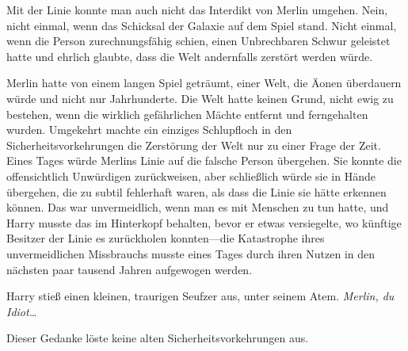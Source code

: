 Mit der Linie konnte man auch nicht das Interdikt von Merlin umgehen. Nein, nicht einmal, wenn das Schicksal der Galaxie auf dem Spiel stand. Nicht einmal, wenn die Person zurechnungsfähig schien, einen Unbrechbaren Schwur geleistet hatte und ehrlich glaubte, dass die Welt andernfalls zerstört werden würde.

Merlin hatte von einem langen Spiel geträumt, einer Welt, die Äonen überdauern würde und nicht nur Jahrhunderte. Die Welt hatte keinen Grund, nicht ewig zu bestehen, wenn die wirklich gefährlichen Mächte entfernt und ferngehalten wurden. Umgekehrt machte ein einziges Schlupfloch in den Sicherheitsvorkehrungen die Zerstörung der Welt nur zu einer Frage der Zeit.
Eines Tages würde Merlins Linie auf die falsche Person übergehen. Sie konnte die offensichtlich Unwürdigen zurückweisen, aber schließlich würde sie in Hände übergehen, die zu subtil fehlerhaft waren, als dass die Linie sie hätte erkennen können. Das war unvermeidlich, wenn man es mit Menschen zu tun hatte, und Harry musste das im Hinterkopf behalten, bevor er etwas versiegelte, wo künftige Besitzer der Linie es zurückholen konnten—die Katastrophe ihres unvermeidlichen Missbrauchs musste eines Tages durch ihren Nutzen in den nächsten paar tausend Jahren aufgewogen werden.

Harry stieß einen kleinen, traurigen Seufzer aus, unter seinem Atem.
\emph{Merlin, du Idiot…}

Dieser Gedanke löste keine alten Sicherheitsvorkehrungen aus.

